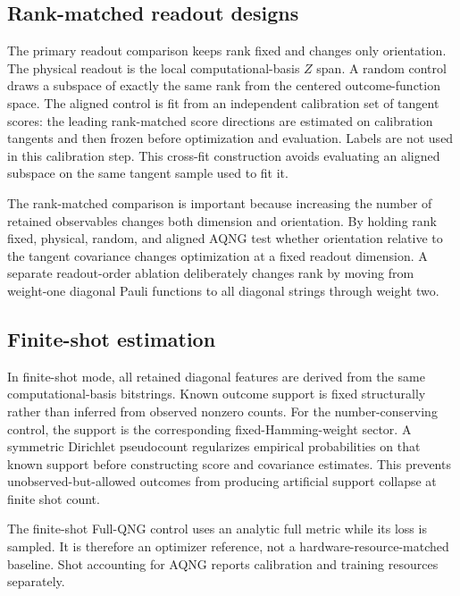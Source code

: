 \subsection{Rank-matched readout designs}
The primary readout comparison keeps rank fixed and changes only orientation. The physical readout is the local computational-basis $Z$ span. A random control draws a subspace of exactly the same rank from the centered outcome-function space. The aligned control is fit from an independent calibration set of tangent scores: the leading rank-matched score directions are estimated on calibration tangents and then frozen before optimization and evaluation. Labels are not used in this calibration step. This cross-fit construction avoids evaluating an aligned subspace on the same tangent sample used to fit it.

The rank-matched comparison is important because increasing the number of retained observables changes both dimension and orientation. By holding rank fixed, physical, random, and aligned AQNG test whether orientation relative to the tangent covariance changes optimization at a fixed readout dimension. A separate readout-order ablation deliberately changes rank by moving from weight-one diagonal Pauli functions to all diagonal strings through weight two.

\subsection{Finite-shot estimation}
In finite-shot mode, all retained diagonal features are derived from the same computational-basis bitstrings. Known outcome support is fixed structurally rather than inferred from observed nonzero counts. For the number-conserving control, the support is the corresponding fixed-Hamming-weight sector. A symmetric Dirichlet pseudocount regularizes empirical probabilities on that known support before constructing score and covariance estimates. This prevents unobserved-but-allowed outcomes from producing artificial support collapse at finite shot count.

The finite-shot Full-QNG control uses an analytic full metric while its loss is sampled. It is therefore an optimizer reference, not a hardware-resource-matched baseline. Shot accounting for AQNG reports calibration and training resources separately.
